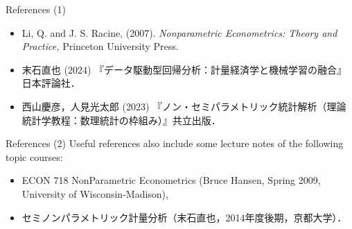 \documentclass[xcolor=svgnames,dvipdfmx,cjk]{beamer}
\theoremstyle{example}
\begin{document}
\begin{frame}{References (1)}
  \begin{itemize}
    \item Li, Q. and J. S. Racine, (2007). 
          \textit{Nonparametric Econometrics: Theory and Practice,} 
          Princeton University Press.
    \item 末石直也 (2024) 『データ駆動型回帰分析：計量経済学と機械学習の融合』日本評論社．
    \item 西山慶彦，人見光太郎 (2023) 『ノン・セミパラメトリック統計解析（理論統計学教程：数理統計の枠組み）』共立出版．
  \end{itemize}
\end{frame}

\begin{frame}{References (2)}
\quad 
Useful references also include some lecture notes of the following topic courses:
  \begin{itemize}
    \item ECON 718 NonParametric Econometrics (Bruce Hansen, Spring 2009, University of Wisconsin-Madison),
    \item セミノンパラメトリック計量分析（末石直也，2014年度後期，京都大学）．
  \end{itemize}
\end{frame}
\end{document}
